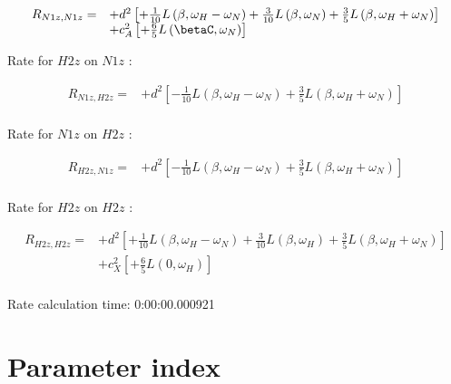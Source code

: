 \documentclass[showkeys,aps,prb,prepreint,amssymb, amsmath,nobibnotes]{article}
\begin{document}
\begin{small}
\begin{equation}\begin{array}{rl}
R_{N1z,N1z}=
& + d^2 \left[ +\frac{1}{10} L\left(\beta,\omega_H-\omega_N\right) +\frac{3}{10} L\left(\beta,\omega_N\right) +\frac{3}{5} L\left(\beta,\omega_H+\omega_N\right)\right]\\
& + c_A^2 \left[ +\frac{6}{5} L\left(\betaC,\omega_N\right)\right]\\
\end{array}\end{equation}
\end{small}

Rate for $H2z$ on $N1z$ :

\begin{small}
\begin{equation}\begin{array}{rl}
R_{N1z,H2z}=
& + d^2 \left[ -\frac{1}{10} L\left(\beta,\omega_H-\omega_N\right) +\frac{3}{5} L\left(\beta,\omega_H+\omega_N\right)\right]\\
\end{array}\end{equation}
\end{small}

Rate for $N1z$ on $H2z$ :

\begin{small}
\begin{equation}\begin{array}{rl}
R_{H2z,N1z}=
& + d^2 \left[ -\frac{1}{10} L\left(\beta,\omega_H-\omega_N\right) +\frac{3}{5} L\left(\beta,\omega_H+\omega_N\right)\right]\\
\end{array}\end{equation}
\end{small}

Rate for $H2z$ on $H2z$ :

\begin{small}
\begin{equation}\begin{array}{rl}
R_{H2z,H2z}=
& + d^2 \left[ +\frac{1}{10} L\left(\beta,\omega_H-\omega_N\right) +\frac{3}{10} L\left(\beta,\omega_H\right) +\frac{3}{5} L\left(\beta,\omega_H+\omega_N\right)\right]\\
& + c_X^2 \left[ +\frac{6}{5} L\left(0,\omega_H\right)\right]\\
\end{array}\end{equation}
\end{small}
Rate calculation time: 0:00:00.000921\section{Parameter index}
\end{document}
